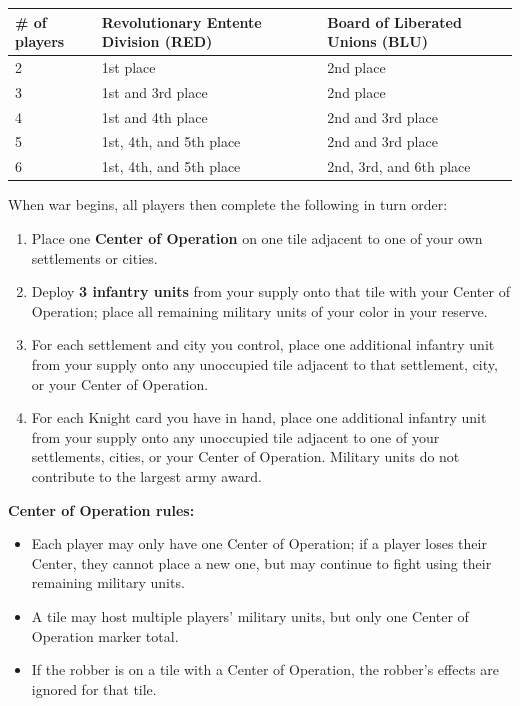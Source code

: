 \documentclass[12pt]{report}
\begin{document}
\begin{center}
  \begin{tabular}{lll}
    \toprule
    \# of players & Revolutionary Entente Division (RED) & Board of Liberated Unions (BLU) \\
    \midrule
    2 & 1st place & 2nd place \\
    3 & 1st and 3rd place & 2nd place \\
    4 & 1st and 4th place & 2nd and 3rd place \\
    5 & 1st, 4th, and 5th place & 2nd and 3rd place \\
    6 & 1st, 4th, and 5th place & 2nd, 3rd, and 6th place \\
    \bottomrule
  \end{tabular}
\end{center}

When war begins, all players then complete the following in turn order:
\begin{enumerate}[leftmargin=1.2cm]
  \item Place one \textbf{Center of Operation} on one tile adjacent to one of your own settlements or cities.
  \item Deploy \textbf{3 infantry units} from your supply onto that tile with your Center of Operation; place all remaining military units of your color in your reserve.
  \item For each settlement and city you control, place one additional infantry unit from your supply onto any unoccupied tile adjacent to that settlement, city, or your Center of Operation.
  \item For each Knight card you have in hand, place one additional infantry unit from your supply onto any unoccupied tile adjacent to one of your settlements, cities, or your Center of Operation. Military units do not contribute to the largest army award.
\end{enumerate}

\textbf{Center of Operation rules:}
\begin{itemize}[leftmargin=1.2cm]
  \item Each player may only have one Center of Operation; if a player loses their Center, they cannot place a new one, but may continue to fight using their remaining military units.
  \item A tile may host multiple players' military units, but only one Center of Operation marker total.
  \item If the robber is on a tile with a Center of Operation, the robber's effects are ignored for that tile.
\end{itemize}
\end{document}
